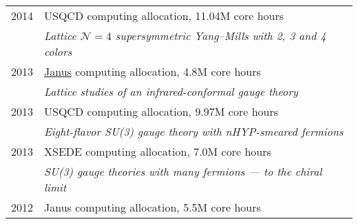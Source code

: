 \begin{spacelistout}
\begin{tabular}[t]{cl}
      2014 & USQCD computing allocation, 11.04M core hours                                                                                                                                                                             \\ %
           & \textit{Lattice $\mathcal N = 4$ supersymmetric Yang--Mills with 2, 3 and 4 colors}                                                                                                                                       \\[6 pt]
      2013 & \href{https://www.top500.org/system/176922}{Janus} computing allocation, 4.8M core hours                                                                                                                                  \\ %
           & \textit{Lattice studies of an infrared-conformal gauge theory}                                                                                                                                                            \\[6 pt]
      2013 & USQCD computing allocation, 9.97M core hours                                                                                                                                                                              \\ %
           & \textit{Eight-flavor SU(3) gauge theory with nHYP-smeared fermions}                                                                                                                                                       \\[6 pt]
      2013 & XSEDE computing allocation, 7.0M core hours                                                                                                                                                                               \\ %
           & \textit{SU(3) gauge theories with many fermions --- to the chiral limit}                                                                                                                                                  \\[6 pt]
      2012 & Janus computing allocation, 5.5M core hours                                                                                                                                                                               \\ %

\end{tabular}
\end{spacelistout}
